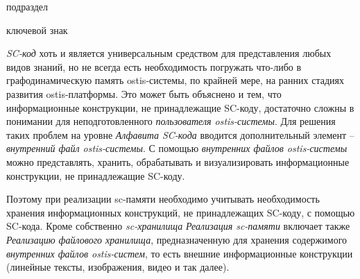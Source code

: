 \begin{SCn}

\begin{scnrelfromlist}{подраздел}
\end{scnrelfromlist}

\begin{scnrelfromlist}{ключевой знак}
	\begin{scnindent}
	\end{scnindent}
\end{scnrelfromlist}

\end{SCn}

\bigskip

\textit{SC-код} хоть и является универсальным средством для представления любых видов знаний, но не всегда есть необходимость погружать что-либо в графодинамическую память ostis-системы, по крайней мере, на ранних стадиях развития ostis-платформы. Это может быть объяснено и тем, что информационные конструкции, не принадлежащие SC-коду, достаточно сложны в понимании для неподготовленного \textit{пользователя ostis-системы}. Для решения таких проблем на уровне \textit{Алфавита SC-кода\scnsupergroupsign} вводится дополнительный элемент -- \textit{внутренний файл ostis-системы}. С помощью \textit{внутренних файлов ostis-системы} можно представлять, хранить, обрабатывать и визуализировать информационные конструкции, не принадлежащие SC-коду.

Поэтому при реализации sc-памяти необходимо учитывать необходимость хранения информационных конструкций, не принадлежащих SC-коду, с помощью SC-кода. Кроме собственно \textit{sc-хранилища} \textit{Реализация sc-памяти} включает также \textit{Реализацию файлового хранилища}, предназначенную для хранения содержимого \textit{внутренних файлов ostis-систем}, то есть внешние информационные конструкции (линейные тексты, изображения, видео и так далее).

